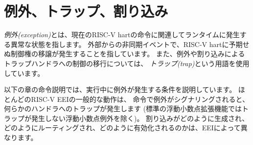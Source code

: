 \begin{comment}
\section{Exceptions, Traps, and Interrupts}
\label{sec:trap-defn}

We use the term {\em exception} to refer to an unusual condition
occurring at run time associated with an instruction in the current
RISC-V hart.  We use the term {\em interrupt} to refer to an external
asynchronous event that may cause a RISC-V hart to experience an
unexpected transfer of control.  We use the term {\em trap} to refer
to the transfer of control to a trap handler caused by either an
exception or an interrupt.

The instruction descriptions in following chapters describe conditions
that can raise an exception during execution.  The general behavior of
most RISC-V EEIs is that a trap to some handler occurs when an
exception is signaled on an instruction (except for floating-point
exceptions, which, in the standard floating-point extensions, do not
cause traps).  The manner in which interrupts are generated, routed
to, and enabled by a hart depends on the EEI.
\end{comment}

\section{例外、トラップ、割り込み}
\label{sec:trap-defn}

{\em 例外(exception)}とは、現在のRISC-V hartの命令に関連してランタイムに発生する異常な状態を指します。
外部からの非同期イベントで、RISC-V hartに予期せぬ制御権の移譲が発生することを指しています。
また、例外や割り込みによるトラップハンドラへの制御の移行については、
{\em トラップ(trap)}という用語を使用しています。

以下の章の命令説明では、実行中に例外が発生する条件を説明しています。 
ほとんどのRISC-V EEIの一般的な動作は、
命令で例外がシグナリングされると、何らかのハンドラへのトラップが発生します
(標準の浮動小数点拡張機能ではトラップが発生しない浮動小数点例外を除く)。 
割り込みがどのように生成され、どのようにルーティングされ、どのように有効化されるのかは、EEIによって異なります。

\begin{comment}
\begin{commentary}
Our use of ``exception'' and ``trap'' is compatible with that in the IEEE-754
floating-point standard.
\end{commentary}
\end{comment}

